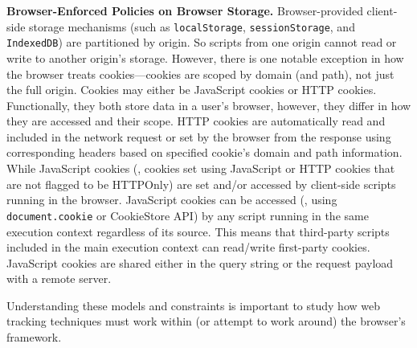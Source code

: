 \noindent \textbf{Browser-Enforced Policies on Browser Storage.} 
%
Browser-provided client-side storage mechanisms (such as \texttt{localStorage}, \texttt{sessionStorage}, and \texttt{IndexedDB}) are partitioned by origin.
%
So scripts from one origin cannot read or write to another origin’s storage. 
%
However, there is one notable exception in how the browser treats cookies---cookies are scoped by domain (and path), not just the full origin. 
%
%
%
Cookies may either be JavaScript cookies or HTTP cookies. 
%
Functionally, they both store data in a user's browser, however, they differ in how they are accessed and their scope.
%
HTTP cookies are automatically read and included in the network request or set by the browser from the response using corresponding headers based on specified cookie's domain and path information.
%
While JavaScript cookies (\ie{}, cookies set using JavaScript or HTTP cookies that are not flagged to be HTTPOnly) are set and/or accessed by client-side scripts running in the browser. 
%
JavaScript cookies can be accessed (\eg{}, using \texttt{document.cookie} or CookieStore API) by any script running in the same execution context regardless of its source. 
%
This means that third-party scripts included in the main execution context can read/write first-party cookies. 
%
JavaScript cookies are shared either in the query string or the request payload with a remote server.
%


Understanding these models and constraints is important to study how web tracking techniques must work within (or attempt to work around) the browser’s framework.